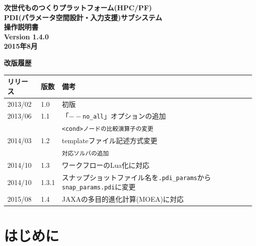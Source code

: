 \documentclass[a4paper,11pt]{jarticle}
\begin{document}
\begin{titlepage}
\vspace*{7cm}
\begin{center}%
{\LARGE \bf 次世代ものつくりプラットフォーム(HPC/PF)\\

PDI(パラメータ空間設計・入力支援)サブシステム\\

操作説明書\\}
\vspace*{2.5cm}
\bf Version 1.4.0\\
\vspace*{3.5cm}
\vspace*{1cm}
\vspace*{2cm}
\bf 2015年8月\\
\end{center}
\end{titlepage}


\newpage

{\Large\bf 改版履歴}

\vspace{12pt}
\begin{tabular}{|l|l|l|} \hline
リリース & 版数 & 備考\hspace*{11cm}\\ \hline
2013/02 & 1.0 & 初版\\ \hline
2013/06 & 1.1 & 「{\tt $--$no\_all}」オプションの追加\\
 & & {\tt <cond>ノードの比較演算子の変更}\\ \hline
2014/03 & 1.2 & templateファイル記述方式変更\\
 & & {\tt 対応ソルバの追加}\\ \hline
2014/10 & 1.3 & ワークフローのLua化に対応\\ \hline
2014/10 & 1.3.1 & スナップショットファイル名を{\tt .pdi\_params}から{\tt snap\_params.pdi}に変更\\ \hline
2015/08 & 1.4 & JAXAの多目的進化計算(MOEA)に対応\\ \hline
\end{tabular}

\newpage
\tableofcontents


\newpage
\section*{はじめに}
\end{document}
